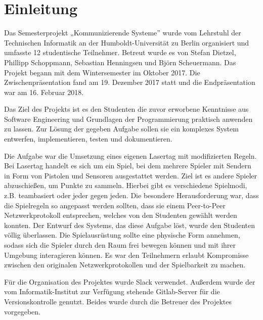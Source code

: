 \section{Einleitung}

Das Semesterprojekt „Kommunizierende Systeme” wurde vom Lehrstuhl der Technischen Informatik an der
Humboldt-Universität zu Berlin organisiert und umfasste 12 studentische Teilnehmer.
Betreut wurde es von Stefan Dietzel, Phillipp Schoppmann, Sebastian Henningsen und Björn
Scheuermann.
Das Projekt begann mit dem Wintersemester im Oktober 2017.
Die Zwischenpräsentation fand am 19. Dezember 2017 statt und die Endpräsentation war am
16. Februar 2018.

Das Ziel des Projekts ist es den Studenten die zuvor erworbene Kenntnisse aus
Software Engineering und Grundlagen der Programmierung praktisch anwenden zu
lassen. Zur Lösung der gegeben Aufgabe sollen sie ein komplexes System
entwerfen, implementieren, testen und dokumentieren.

Die Aufgabe war die Umsetzung eines eigenen Lasertag mit modifizierten Regeln.
Bei Lasertag handelt es sich um ein Spiel, bei dem mehrere Spieler mit Sendern
in Form von Pistolen und Sensoren ausgestattet werden. Ziel ist es andere
Spieler abzuschießen, um Punkte zu sammeln. Hierbei gibt es verschiedene
Spielmodi, z.B. teambasiert oder jeder gegen jeden. Die besondere Herausforderung
war, dass die Spielregeln so angepasst werden sollten, dass sie einem Peer-to-Peer
Netzwerkprotokoll entsprechen, welches von den Studenten gewählt werden konnten.
Der Entwurf des Systems, das diese Aufgabe löst, wurde den Studenten völlig
überlassen. Die Spielausrüstung sollte eine physische Form annehmen, sodass
sich die Spieler durch den Raum frei bewegen können und mit ihrer Umgebung
interagieren können. Es war den Teilnehmern erlaubt Kompromisse zwischen den
originalen Netzwerkprotokollen und der Spielbarkeit zu machen.

Für die Organisation des Projektes wurde Slack verwendet.
Außerdem wurde der vom Informatik-Institut zur Verfügung stehende Gitlab-Server für die
Versionskontrolle genutzt.
Beides wurde durch die Betreuer des Projektes vorgegeben.
